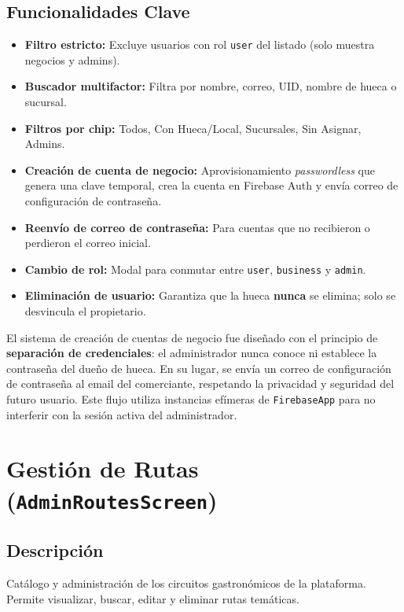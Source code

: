 \documentclass[11pt, a4paper, oneside]{report}
\begin{document}
\subsection{Funcionalidades Clave}
\begin{itemize}
  \item \textbf{Filtro estricto:} Excluye usuarios con rol \texttt{user} del listado (solo muestra negocios y admins).
  \item \textbf{Buscador multifactor:} Filtra por nombre, correo, UID, nombre de hueca o sucursal.
  \item \textbf{Filtros por chip:} Todos, Con Hueca/Local, Sucursales, Sin Asignar, Admins.
  \item \textbf{Creación de cuenta de negocio:} Aprovisionamiento \textit{passwordless} que genera una clave temporal, crea la cuenta en Firebase Auth y envía correo de configuración de contraseña.
  \item \textbf{Reenvío de correo de contraseña:} Para cuentas que no recibieron o perdieron el correo inicial.
  \item \textbf{Cambio de rol:} Modal para conmutar entre \texttt{user}, \texttt{business} y \texttt{admin}.
  \item \textbf{Eliminación de usuario:} Garantiza que la hueca \textbf{nunca} se elimina; solo se desvincula el propietario.
\end{itemize}

\begin{decisionbox}
El sistema de creación de cuentas de negocio fue diseñado con el principio de \textbf{separación de credenciales}: el administrador nunca conoce ni establece la contraseña del dueño de hueca. En su lugar, se envía un correo de configuración de contraseña al email del comerciante, respetando la privacidad y seguridad del futuro usuario. Este flujo utiliza instancias efímeras de \texttt{FirebaseApp} para no interferir con la sesión activa del administrador.
\end{decisionbox}

\section{Gestión de Rutas (\texttt{AdminRoutesScreen})}

\subsection{Descripción}
Catálogo y administración de los circuitos gastronómicos de la plataforma. Permite visualizar, buscar, editar y eliminar rutas temáticas.
\end{document}
